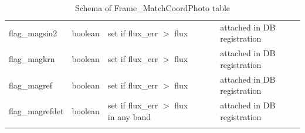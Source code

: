 \documentclass[12pt]{article}
\begin{document}
\begin{table}[thbp]
\begin{center}
{\begin{tabular}{llllll}
flag\_magsin2 & boolean & set if flux\_err $>$ flux                                   &                           &                  & attached in DB registration  \\
flag\_magkrn & boolean & set if flux\_err $>$ flux                                   &                           &                  & attached in DB registration  \\
flag\_magref & boolean & set if flux\_err $>$ flux                                   &                           &                  & attached in DB registration  \\
flag\_magrefdet & boolean & set if flux\_err $>$ flux in any band                       &                           &                  & attached in DB registration  \\
\hline\\
\end{tabular}
}
\caption{Schema of Frame\_MatchCoordPhoto table}
\end{center}
\end{table}
\end{document}
